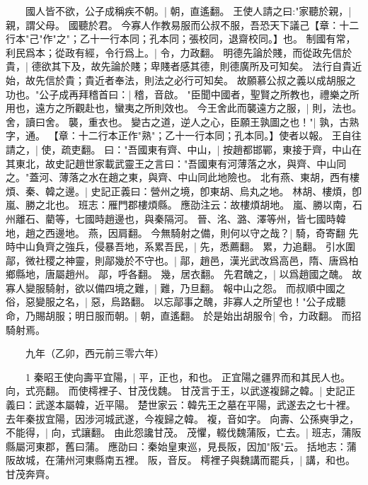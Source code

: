 　　國人皆不欲，公子成稱疾不朝。|{
	朝，直遙翻。
}
王使人請之曰:"家聽於親，|{
	親，謂父母。
}
國聽於君。
	今寡人作教易服而公叔不服，吾恐天下議己【章：十二行本"己"作"之"；乙十一行本同；孔本同；張校同，退齋校同。】也。
	制國有常，利民爲本；從政有經，令行爲上。|{
	令，力政翻。
}
明德先論於賤，而從政先信於貴，|{
	德欲其下及，故先論於賤；卑賤者感其德，則德廣所及可知矣。
	法行自貴近始，故先信於貴；貴近者奉法，則法之必行可知矣。
}
故願慕公叔之義以成胡服之功也。"公子成再拜稽首曰：|{
	稽，音啟。
}
"臣聞中國者，聖賢之所教也，禮樂之所用也，遠方之所觀赴也，蠻夷之所則效也。
	今王舍此而襲遠方之服，|{
	則，法也。
	舍，讀曰舍。
	襲，重衣也。
}
變古之道，逆人之心，臣願王孰圖之也！"|{
	孰，古熟字，通。
}
【章：十二行本正作"熟"；乙十一行本同；孔本同。】使者以報。
	王自往請之，|{
	使，疏吏翻。
}
曰："吾國東有齊、中山，|{
	按趙都邯鄲，東接于齊，中山在其東北，故史記趙世家載武靈王之言曰："吾國東有河薄落之水，與齊、中山同之。"蓋河、薄落之水在趙之東，與齊、中山同此地險也。
}
北有燕、東胡，西有樓煩、秦、韓之邊。|{
	史記正義曰：營州之境，卽東胡、烏丸之地。
	林胡、樓煩，卽嵐、勝之北也。
	班志：雁門郡樓煩縣。
	應劭注云：故樓煩胡地。
	嵐、勝以南，石州離石、藺等，七國時趙邊也，與秦隔河。
	晉、洺、潞、澤等州，皆七國時韓地，趙之西邊地。
	燕，因肩翻。
}
今無騎射之備，則何以守之哉？|{
	騎，奇寄翻
	}
先時中山負齊之強兵，侵暴吾地，系累吾民，|{
	先，悉薦翻。
	累，力追翻。
}
引水圍鄗，微社稷之神靈，則鄗幾於不守也。|{
	鄗，趙邑，漢光武改爲高邑，隋、唐爲柏鄉縣地，唐屬趙州。
	鄗，呼各翻。
	幾，居衣翻。
}
先君醜之，|{
	以爲趙國之醜。
}
故寡人變服騎射，欲以備四境之難，|{
	難，乃旦翻。
}
報中山之怨。
	而叔順中國之俗，惡變服之名，|{
	惡，烏路翻。
}
以忘鄗事之醜，非寡人之所望也！"公子成聽命，乃賜胡服；明日服而朝。|{
	朝，直遙翻。
}
於是始出胡服令|{
	令，力政翻。
}
而招騎射焉。


　　九年（乙卯，西元前三零六年）

　　1 秦昭王使向壽平宜陽，|{
	平，正也，和也。
	正宜陽之疆界而和其民人也。
	向，式亮翻。
}
而使樗裡子、甘茂伐魏。
	甘茂言于王，以武遂複歸之韓。|{
	史記正義曰：武遂本屬韓，近平陽。
	楚世家云：韓先王之墓在平陽，武遂去之七十裡。
	去年秦拔宜陽，因涉河城武遂，今複歸之韓。
	複，音如字。
}
向壽、公孫奭爭之，不能得，|{
	向，式讓翻。
}
由此怨讒甘茂。
	茂懼，輟伐魏蒲阪，亡去。|{
	班志，蒲阪縣屬河東郡，舊曰蒲。
	應劭曰：秦始皇東巡，見長阪，因加"阪"云。
	括地志：蒲阪故城，在蒲州河東縣南五裡。
	阪，音反。
}
樗裡子與魏講而罷兵，|{
	講，和也。
}
甘茂奔齊。


